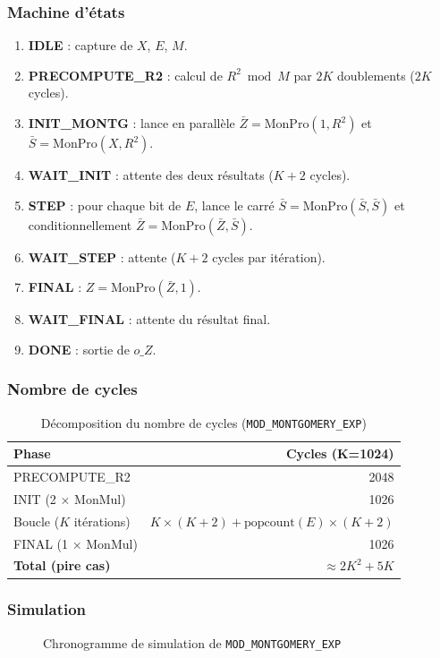 \subsubsection{Machine d'états}
\begin{enumerate}
  \item \textbf{IDLE} : capture de $X$, $E$, $M$.
  \item \textbf{PRECOMPUTE\_R2} : calcul de $R^2 \bmod M$ par $2K$
        doublements ($2K$ cycles).
  \item \textbf{INIT\_MONTG} : lance en parallèle
        $\bar{Z} = \text{MonPro}(1, R^2)$ et
        $\bar{S} = \text{MonPro}(X, R^2)$.
  \item \textbf{WAIT\_INIT} : attente des deux résultats ($K+2$ cycles).
  \item \textbf{STEP} : pour chaque bit de $E$, lance le carré
        $\bar{S} = \text{MonPro}(\bar{S}, \bar{S})$ et conditionnellement
        $\bar{Z} = \text{MonPro}(\bar{Z}, \bar{S})$.
  \item \textbf{WAIT\_STEP} : attente ($K+2$ cycles par itération).
  \item \textbf{FINAL} : $Z = \text{MonPro}(\bar{Z}, 1)$.
  \item \textbf{WAIT\_FINAL} : attente du résultat final.
  \item \textbf{DONE} : sortie de $o\_Z$.
\end{enumerate}

\subsubsection{Nombre de cycles}
\begin{table}[H]
\centering
\caption{Décomposition du nombre de cycles (\texttt{MOD\_MONTGOMERY\_EXP})}
\begin{tabular}{lr}
\toprule
\textbf{Phase} & \textbf{Cycles (K=1024)} \\
\midrule
PRECOMPUTE\_R2          & 2048 \\
INIT (2 × MonMul)      & 1026 \\
Boucle ($K$ itérations) & $K \times (K+2) + \text{popcount}(E) \times (K+2)$ \\
FINAL (1 × MonMul)     & 1026 \\
\midrule
\textbf{Total (pire cas)} & $\approx 2K^2 + 5K$ \\
\bottomrule
\end{tabular}
\end{table}

\subsubsection{Simulation}
\begin{figure}[H]
\centering
{}
\caption{Chronogramme de simulation de \texttt{MOD\_MONTGOMERY\_EXP}}
\label{fig:sim_exp}
\end{figure}


